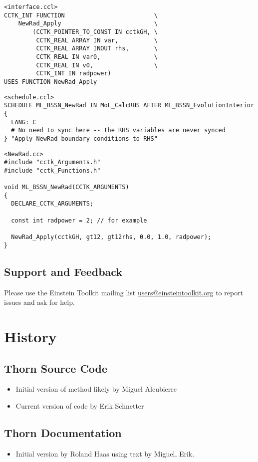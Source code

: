 \begin{verbatim}
<interface.ccl>
CCTK_INT FUNCTION                         \
    NewRad_Apply                          \
        (CCTK_POINTER_TO_CONST IN cctkGH, \
         CCTK_REAL ARRAY IN var,          \
         CCTK_REAL ARRAY INOUT rhs,       \
         CCTK_REAL IN var0,               \
         CCTK_REAL IN v0,                 \
         CCTK_INT IN radpower)
USES FUNCTION NewRad_Apply
\end{verbatim}

\begin{verbatim}
<schedule.ccl>
SCHEDULE ML_BSSN_NewRad IN MoL_CalcRHS AFTER ML_BSSN_EvolutionInterior
{
  LANG: C
  # No need to sync here -- the RHS variables are never synced
} "Apply NewRad boundary conditions to RHS"
\end{verbatim}

\begin{verbatim}
<NewRad.cc>
#include "cctk_Arguments.h"
#include "cctk_Functions.h"

void ML_BSSN_NewRad(CCTK_ARGUMENTS)
{
  DECLARE_CCTK_ARGUMENTS;

  const int radpower = 2; // for example

  NewRad_Apply(cctkGH, gt12, gt12rhs, 0.0, 1.0, radpower);
}
\end{verbatim}

\subsection{Support and Feedback}
Please use the Einstein Toolkit mailing list
\url{users@einsteintoolkit.org} to report issues and ask for help.

\section{History}

\subsection{Thorn Source Code}
\begin{itemize}
\item Initial version of method likely by Miguel Alcubierre
\item Current version of code by Erik Schnetter
\end{itemize}

\subsection{Thorn Documentation}
\begin{itemize}
\item Initial version by Roland Haas using text by Miguel, Erik.
\end{itemize}

